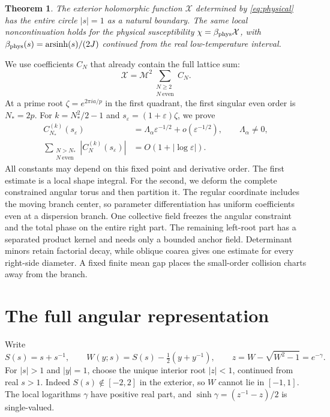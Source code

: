 \documentclass[11pt]{article}
\numberwithin{equation}{section}
\newtheorem{theorem}{Theorem}[section]
\theoremstyle{remark}\newtheorem{remark}[theorem]{Remark}
\newcommand{\X}{\mathcal X}
\newcommand{\Mtwo}{\mathcal M^2}
\begin{document}
\begin{theorem}\label{thm:main}
The exterior holomorphic function $\X$ determined by
\eqref{eq:physical} has the entire circle $|s|=1$ as a natural
boundary. The same local noncontinuation holds for the physical
susceptibility $\chi=\beta_{\rm phys}\X$, with
$\beta_{\rm phys}(s)=\operatorname{arsinh}(s)/(2J)$ continued from
the real low-temperature interval.
\end{theorem}

We use coefficients $C_N$ that already contain the full lattice sum:
\[
 \X=\Mtwo\sum_{\substack{N\ge2\\N\ \mathrm{even}}} C_N.
\]
At a prime root $\zeta=e^{2\pi ia/p}$ in the first quadrant,
the first singular even order is $N_*=2p$. For
$k=N_*^2/2-1$ and $s_\varepsilon=(1+\varepsilon)\zeta$, we prove
\begin{equation}\label{eq:two-goals}
 \begin{split}
 C_{N_*}^{(k)}(s_\varepsilon)
    &=\Lambda_\alpha\varepsilon^{-1/2}+o(\varepsilon^{-1/2}),
                  \qquad \Lambda_\alpha\ne0,\\
 \sum_{\substack{N>N_*\\N\ \mathrm{even}}}
          |C_N^{(k)}(s_\varepsilon)|
    &=O(1+|\log\varepsilon|).
 \end{split}
\end{equation}
All constants may depend on this fixed point and derivative order.
The first estimate is a local shape integral. For the second, we
deform the complete constrained angular torus and then partition it.
The regular coordinate includes the moving branch center, so
parameter differentiation has uniform coefficients even at a
dispersion branch. One collective field freezes the angular
constraint and the total phase on the entire right part. The
remaining left-root part has a separated product kernel and needs
only a bounded anchor field. Determinant minors retain factorial
decay, while oblique coarea gives one estimate for every right-side
diameter. A fixed finite mean gap places the small-order collision
charts away from the branch.

\section{The full angular representation}
\label{sec:representation}\label{sec:angular-bulk}

Write
\[
 S(s)=s+s^{-1},\qquad
 W(y;s)=S(s)-\tfrac12(y+y^{-1}),\qquad
 z=W-\sqrt{W^2-1}=e^{-\gamma}.
\]
For $|s|>1$ and $|y|=1$, choose the unique interior root $|z|<1$,
continued from real $s>1$. Indeed $S(s)\notin[-2,2]$ in the
exterior, so $W$ cannot lie in $[-1,1]$. The local logarithms
$\gamma$ have positive real part, and
$\sinh\gamma=(z^{-1}-z)/2$ is single-valued.
\end{document}

